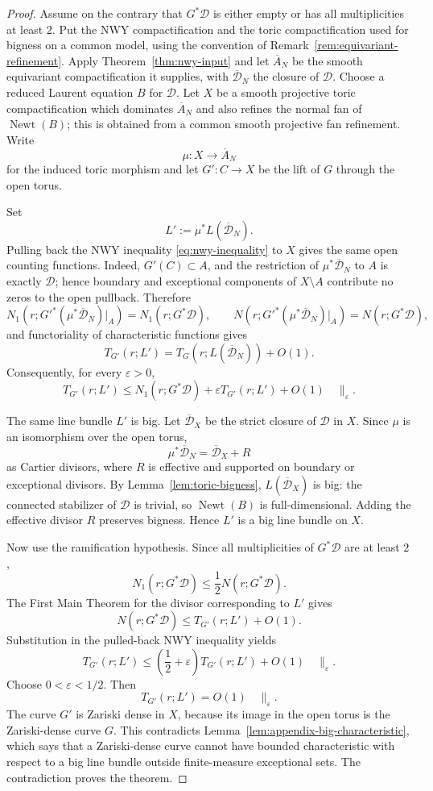 \documentclass[11pt]{amsart}
\def\CC{C}%
\numberwithin{equation}{section}
\theoremstyle{definition}
\theoremstyle{remark}
\newcommand{\CC}{\mathbb C}
\newcommand{\Newt}{\operatorname{Newt}}
\begin{document}
\begin{proof}
Assume on the contrary that $G^*\mathcal D$ is either empty or has all multiplicities at least $2$.  Put the NWY compactification and the toric compactification used for bigness on a common model, using the convention of Remark~\ref{rem:equivariant-refinement}.  Apply Theorem~\ref{thm:nwy-input} and let $\overline A_N$ be the smooth equivariant compactification it supplies, with $\overline{\mathcal D}_N$ the closure of $\mathcal D$.  Choose a reduced Laurent equation $B$ for $\mathcal D$.  Let $X$ be a smooth projective toric compactification which dominates $\overline A_N$ and also refines the normal fan of $\Newt(B)$; this is obtained from a common smooth projective fan refinement.  Write
\[
\mu:X\to\overline A_N
\]
for the induced toric morphism and let $G':\CC\to X$ be the lift of $G$ through the open torus.

Set
\[
L':=\mu^*L(\overline{\mathcal D}_N).
\]
Pulling back the NWY inequality \eqref{eq:nwy-inequality} to $X$ gives the same open counting functions.  Indeed, $G'(\CC)\subset A$, and the restriction of $\mu^*\overline{\mathcal D}_N$ to $A$ is exactly $\mathcal D$; hence boundary and exceptional components of $X\setminus A$ contribute no zeros to the open pullback.  Therefore
\[
N_1(r;G'^*(\mu^*\overline{\mathcal D}_N)|_A)=N_1(r;G^*\mathcal D),\qquad
N(r;G'^*(\mu^*\overline{\mathcal D}_N)|_A)=N(r;G^*\mathcal D),
\]
and functoriality of characteristic functions gives
\[
T_{G'}(r;L')=T_G(r;L(\overline{\mathcal D}_N))+O(1).
\]
Consequently, for every $\varepsilon>0$,
\[
T_{G'}(r;L')
\le
N_1(r;G^*\mathcal D)+\varepsilon T_{G'}(r;L')+O(1)\quad\|_\varepsilon.
\]

The same line bundle $L'$ is big.  Let $\overline{\mathcal D}_X$ be the strict closure of $\mathcal D$ in $X$.  Since $\mu$ is an isomorphism over the open torus,
\[
\mu^*\overline{\mathcal D}_N=\overline{\mathcal D}_X+R
\]
as Cartier divisors, where $R$ is effective and supported on boundary or exceptional divisors.  By Lemma~\ref{lem:toric-bigness}, $L(\overline{\mathcal D}_X)$ is big: the connected stabilizer of $\mathcal D$ is trivial, so $\Newt(B)$ is full-dimensional.  Adding the effective divisor $R$ preserves bigness.  Hence $L'$ is a big line bundle on $X$.

Now use the ramification hypothesis.  Since all multiplicities of $G^*\mathcal D$ are at least $2$,
\[
N_1(r;G^*\mathcal D)\le\frac12N(r;G^*\mathcal D).
\]
The First Main Theorem for the divisor corresponding to $L'$ gives
\[
N(r;G^*\mathcal D)\le T_{G'}(r;L')+O(1).
\]
Substitution in the pulled-back NWY inequality yields
\[
T_{G'}(r;L')
\le
\left(\frac12+\varepsilon\right)T_{G'}(r;L')+O(1)\quad\|_\varepsilon.
\]
Choose $0<\varepsilon<1/2$. Then
\[
T_{G'}(r;L')=O(1)\quad\|_\varepsilon.
\]
The curve $G'$ is Zariski dense in $X$, because its image in the open torus is the Zariski-dense curve $G$.  This contradicts Lemma~\ref{lem:appendix-big-characteristic}, which says that a Zariski-dense curve cannot have bounded characteristic with respect to a big line bundle outside finite-measure exceptional sets.  The contradiction proves the theorem.
\end{proof}
\end{document}
